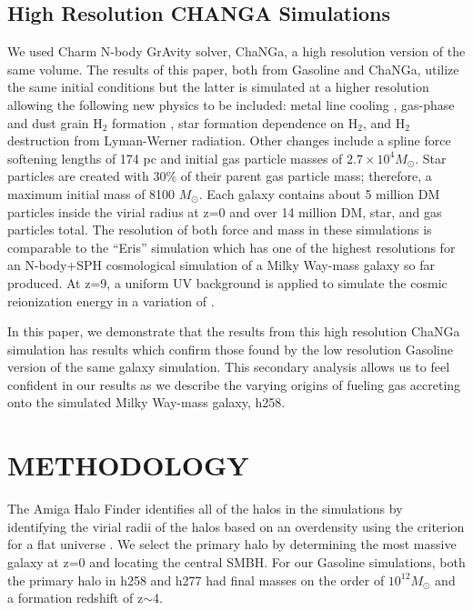 \documentclass[12pt,headA,chapB]{fiskthesis}
\begin{document}
\section{\normalsize High Resolution CHANGA Simulations}

We used Charm N-body GrAvity solver, ChaNGa, a high resolution version of the same volume. The results of this paper, both from Gasoline and ChaNGa, utilize the same initial conditions but the latter is simulated at a higher resolution allowing the following new physics to be included: metal line cooling \citep{Christensen2012,Shen2010}, gas-phase and dust grain H$_2$ formation \citep{Christensen2014}, star formation dependence on H$_2$, and H$_2$ destruction from Lyman-Werner radiation. Other changes include a spline force softening lengths of 174 pc and initial gas particle masses of $2.7 \times 10^4 M_{\odot}$. Star particles are created with 30\% of their parent gas particle mass; therefore, a maximum initial mass of 8100 $M_{\odot}$. Each galaxy contains about 5 million DM particles inside the virial radius at z=0 and over 14 million DM, star, and gas particles total. The resolution of both force and mass in these simulations is comparable to the ``Eris'' simulation which has one of the highest resolutions for an N-body+SPH cosmological simulation of a Milky Way-mass galaxy so far produced.  At z=9, a uniform UV background is applied to simulate the cosmic reionization energy in a variation of \cite{Haardt2012}.

In this paper, we demonstrate that the results from this high resolution ChaNGa simulation has results which confirm those found by the low resolution Gasoline version of the same galaxy simulation. This secondary analysis allows us to feel confident in our results as we describe the varying origins of fueling gas accreting onto the simulated Milky Way-mass galaxy, h258.


\chapter{\normalsize METHODOLOGY}
\thispagestyle{empty}

The Amiga Halo Finder identifies all of the halos in the simulations by identifying the virial radii of the halos based on an overdensity using the criterion for a flat universe \citep{Knebe2001,Knollmann2009,Gill2004}. We select the primary halo by determining the most massive galaxy at z=0 and locating the central SMBH. For our Gasoline simulations, both the primary halo in h258 and h277 had final masses on the order of $10^{12} M_{\odot}$ and a formation redshift of z$\sim$4.  
\end{document}
